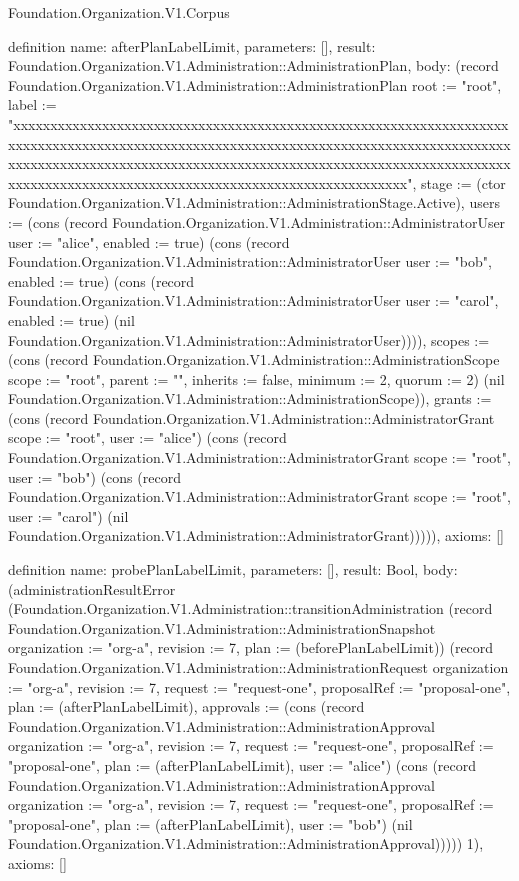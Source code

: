 \begin{lexlean}{Foundation.Organization.V1.Corpus}
\begin{semanticmodule}
definition{
  name: afterPlanLabelLimit,
  parameters: [],
  result: Foundation.Organization.V1.Administration::AdministrationPlan,
  body: (record Foundation.Organization.V1.Administration::AdministrationPlan {root := "root", label := "xxxxxxxxxxxxxxxxxxxxxxxxxxxxxxxxxxxxxxxxxxxxxxxxxxxxxxxxxxxxxxxxxxxxxxxxxxxxxxxxxxxxxxxxxxxxxxxxxxxxxxxxxxxxxxxxxxxxxxxxxxxxxxxxxxxxxxxxxxxxxxxxxxxxxxxxxxxxxxxxxxxxxxxxxxxxxxxxxxxxxxxxxxxxxxxxxxxxxxxxxxxxxxxxxxxxxxxxxxxxxxxxxxxxxxxxxxxxxxxxxxxxxxxxxxxxxxxxx", stage := (ctor Foundation.Organization.V1.Administration::AdministrationStage.Active), users := (cons (record Foundation.Organization.V1.Administration::AdministratorUser {user := "alice", enabled := true}) (cons (record Foundation.Organization.V1.Administration::AdministratorUser {user := "bob", enabled := true}) (cons (record Foundation.Organization.V1.Administration::AdministratorUser {user := "carol", enabled := true}) (nil Foundation.Organization.V1.Administration::AdministratorUser)))), scopes := (cons (record Foundation.Organization.V1.Administration::AdministrationScope {scope := "root", parent := "", inherits := false, minimum := 2, quorum := 2}) (nil Foundation.Organization.V1.Administration::AdministrationScope)), grants := (cons (record Foundation.Organization.V1.Administration::AdministratorGrant {scope := "root", user := "alice"}) (cons (record Foundation.Organization.V1.Administration::AdministratorGrant {scope := "root", user := "bob"}) (cons (record Foundation.Organization.V1.Administration::AdministratorGrant {scope := "root", user := "carol"}) (nil Foundation.Organization.V1.Administration::AdministratorGrant))))}),
  axioms: []
}

definition{
  name: probePlanLabelLimit,
  parameters: [],
  result: Bool,
  body: (administrationResultError (Foundation.Organization.V1.Administration::transitionAdministration (record Foundation.Organization.V1.Administration::AdministrationSnapshot {organization := "org-a", revision := 7, plan := (beforePlanLabelLimit)}) (record Foundation.Organization.V1.Administration::AdministrationRequest {organization := "org-a", revision := 7, request := "request-one", proposalRef := "proposal-one", plan := (afterPlanLabelLimit), approvals := (cons (record Foundation.Organization.V1.Administration::AdministrationApproval {organization := "org-a", revision := 7, request := "request-one", proposalRef := "proposal-one", plan := (afterPlanLabelLimit), user := "alice"}) (cons (record Foundation.Organization.V1.Administration::AdministrationApproval {organization := "org-a", revision := 7, request := "request-one", proposalRef := "proposal-one", plan := (afterPlanLabelLimit), user := "bob"}) (nil Foundation.Organization.V1.Administration::AdministrationApproval)))})) 1),
  axioms: []
}


\end{semanticmodule}
\end{lexlean}
